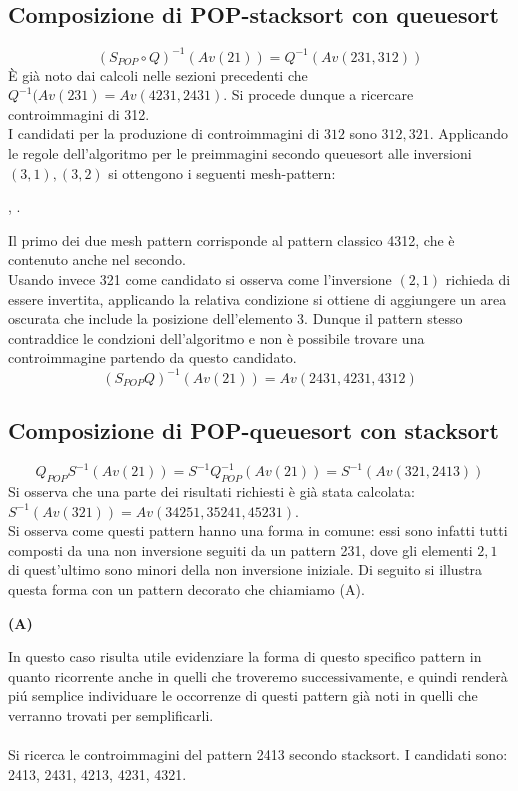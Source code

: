 \subsection*{Composizione di {POP-stacksort} con {queuesort}}
$$(S_{POP}\circ{Q})^{-1}(Av(21))=Q^{-1}(Av(231,312))$$
\`E gi\`a noto dai calcoli nelle sezioni precedenti che $Q^{-1}(Av(231)=Av(4231,2431)$. Si procede dunque a ricercare controimmagini di 312.\\
I candidati per la produzione di controimmagini di $312$ sono $312, 321$. Applicando le regole dell'algoritmo per le preimmagini secondo queuesort alle inversioni $(3,1),(3,2)$ si ottengono i seguenti mesh-pattern:
\begin{center}
,
.
\end{center}
Il primo dei due mesh pattern corrisponde al pattern classico 4312, che \`e contenuto anche nel secondo.\\
Usando invece 321 come candidato si osserva come l'inversione $(2,1)$ richieda di essere invertita, applicando la relativa condizione si ottiene di aggiungere un area oscurata che include la posizione dell'elemento 3. Dunque il pattern stesso contraddice le condzioni dell'algoritmo e non \`e possibile trovare una controimmagine partendo da questo candidato.\\
$$(S_{POP}{Q})^{-1}(Av(21))=Av(2431,4231,4312)$$
\subsection*{Composizione di {POP-queuesort} con {stacksort}}
$$Q_{POP}S^{-1}(Av(21)) = S^{-1}Q_{POP}^{-1}(Av(21)) = S^{-1}(Av(321, 2413))$$
Si osserva che una parte dei risultati richiesti \`e gi\`a stata calcolata: $S^{-1}(Av(321)) = Av(34251, 35241, 45231)$.\\
Si osserva come questi pattern hanno una forma in comune: essi sono infatti tutti composti da una non inversione seguiti da un pattern 231, dove gli elementi $2,1$ di quest'ultimo sono minori della non inversione iniziale. Di seguito si illustra questa forma con un pattern decorato che chiamiamo (A).
\begin{center}
\textbf{(A)}
\end{center}
In questo caso risulta utile evidenziare la forma di questo specifico pattern in quanto ricorrente anche in quelli che troveremo successivamente, e quindi render\`a pi\'u semplice individuare le occorrenze di questi pattern gi\`a noti in quelli che verranno trovati per semplificarli.\\\\
Si ricerca le controimmagini del pattern 2413 secondo stacksort. I candidati sono: 2413, 2431, 4213, 4231, 4321.
